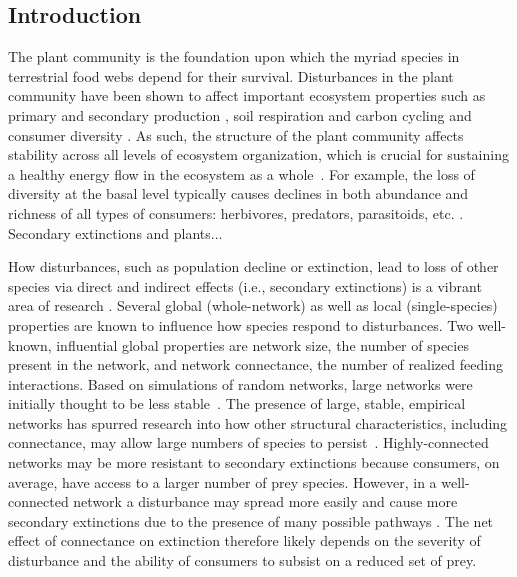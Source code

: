 \documentclass[12pt]{article}
\begin{document}
\begin{spacing}{2.0}

\clearpage
\section*{Introduction} %

     The plant community is the foundation upon which the myriad species in terrestrial food webs depend for their survival. Disturbances in the plant community have been shown to affect important ecosystem properties such as primary \citep{Hector1999} and secondary production \citep{borer2012plant}, soil respiration and carbon cycling \citep{chen2019plant} and consumer diversity \citep{scherber2010bottom, Baiser2016}.
     As such, the structure of the plant community affects stability across all levels of ecosystem organization, which is crucial for sustaining a healthy energy flow in the ecosystem as a whole~\citep{proulx2010diversity, scherber2010bottom, Rosenblatt2016}. 
     For example, the loss of diversity at the basal level typically causes declines in both abundance and richness of all types of consumers: herbivores, predators, parasitoids, etc. \citep{scherber2010bottom}. Secondary extinctions and plants...

    How disturbances, such as population decline or extinction, lead to loss of other species via direct and indirect effects (i.e., secondary extinctions) is a vibrant area of research \citep{Santos2021,curtsdotter2011robustness, dunne2009cascading, Eklof2006}.
    Several global (whole-network) as well as local (single-species) properties are known to influence how species respond to disturbances. Two well-known, influential global properties are network size, the number of species present in the network, and network connectance, the number of realized feeding interactions.
    Based on simulations of random networks, large networks were initially thought to be less stable~\citep{May1972}.
    The presence of large, stable, empirical networks has spurred research into how other structural characteristics, including connectance, may allow large numbers of species to persist~\citep{Dunne2002}.
    Highly-connected networks may be more resistant to secondary extinctions \citep{Dunne2002, Eklof2006} because consumers, on average, have access to a larger number of prey species. However, in a well-connected network a disturbance may spread more easily and cause more secondary extinctions due to the presence of many possible pathways \citep{}.
    The net effect of connectance on extinction therefore likely depends on the severity of disturbance and the ability of consumers to subsist on a reduced set of prey.
    

\end{spacing}
\end{document}

